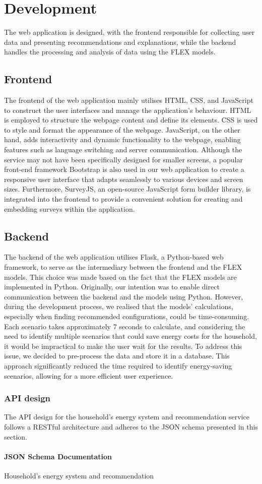 \chapter{Development} 

The web application is designed, 
with the frontend responsible for collecting user data and presenting recommendations and explanations, 
while the backend handles the processing and analysis of data using the FLEX models. 


\section{Frontend}

The frontend of the web application mainly utilises HTML, CSS, and JavaScript to construct the user interfaces and manage the application's behaviour. 
HTML is employed to structure the webpage content and define its elements. 
CSS is used to style and format the appearance of the webpage. 
JavaScript, on the other hand, adds interactivity and dynamic functionality to the webpage, enabling features such as language switching and server communication. 
Although the service may not have been specifically designed for smaller screens, a popular front-end framework Bootstrap is also used in our web application to create a responsive user interface that adapts seamlessly to various devices and screen sizes. 
Furthermore, SurveyJS, an open-source JavaScript form builder library, is integrated into the frontend to provide a convenient solution for creating and embedding surveys within the application. 


\section{Backend}

The backend of the web application utilises Flask, a Python-based web framework, to serve as the intermediary between the frontend and the FLEX models. 
This choice was made based on the fact that the FLEX models are implemented in Python. 
Originally, our intention was to enable direct communication between the backend and the models using Python. 
However, during the development process, we realised that the models' calculations, especially when finding recommended configurations, could be time-consuming. 
Each scenario takes approximately 7 seconds to calculate, and considering the need to identify multiple scenarios that could save energy costs for the household, 
it would be impractical to make the user wait for the results. 
To address this issue, we decided to pre-process the data and store it in a database. 
This approach significantly reduced the time required to identify energy-saving scenarios, allowing for a more efficient user experience.

\subsection{API design}

The API design for the household's energy system and recommendation service follows a RESTful architecture and adheres to the JSON schema presented in this section. 

\subsubsection{JSON Schema Documentation}

Household's energy system and recommendation